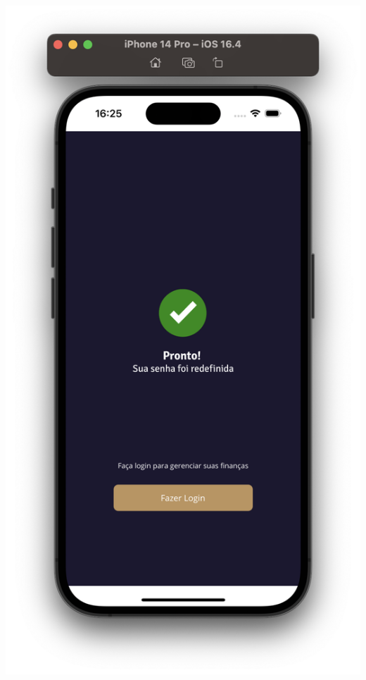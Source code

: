 \begin{center}
\begin{minipage}{0.4\textwidth}
            \label{fig:figura32}
        \end{minipage}%
        \begin{minipage}{0.4\textwidth}
            \centering
            \includegraphics[scale=0.2]{figs/figura33.png}
            \label{fig:figura33}
        \end{minipage}%
    \end{center}

